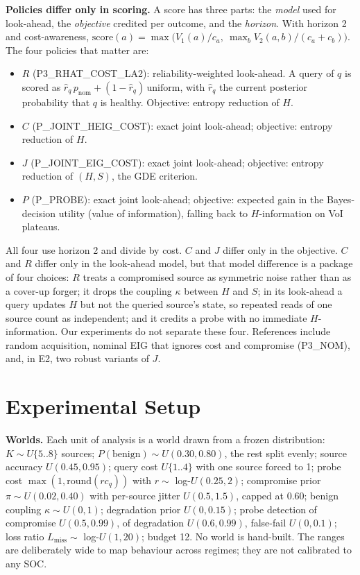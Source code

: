 \documentclass[conference]{IEEEtran}
\newcommand{\pol}[1]{\textsf{#1}}
\begin{document}
\textbf{Policies differ only in scoring.} A score has three parts: the \emph{model} used for look-ahead, the
\emph{objective} credited per outcome, and the \emph{horizon}. With horizon 2 and cost-awareness,
$\text{score}(a)=\max\big(V_1(a)/c_a,\ \max_b V_2(a,b)/(c_a+c_b)\big)$. The four policies that matter are:
\begin{itemize}
\item $R$ (\pol{P3\_RHAT\_COST\_LA2}): reliability-weighted look-ahead. A query of $q$ is scored as
$\hat r_q\,p_{\text{nom}}+(1-\hat r_q)\,\text{uniform}$, with $\hat r_q$ the current posterior probability that $q$ is
healthy. Objective: entropy reduction of $H$.
\item $C$ (\pol{P\_JOINT\_HEIG\_COST}): exact joint look-ahead; objective: entropy reduction of $H$.
\item $J$ (\pol{P\_JOINT\_EIG\_COST}): exact joint look-ahead; objective: entropy reduction of $(H,S)$, the GDE criterion.
\item $P$ (\pol{P\_PROBE}): exact joint look-ahead; objective: expected gain in the Bayes-decision utility (value of
information), falling back to $H$-information on VoI plateaus.
\end{itemize}
All four use horizon 2 and divide by cost. $C$ and $J$ differ only in the objective. $C$ and $R$ differ only in the
look-ahead model, but that model difference is a package of four choices: $R$ treats a compromised source as symmetric
noise rather than as a cover-up forger; it drops the coupling $\kappa$ between $H$ and $S$; in its look-ahead a query
updates $H$ but not the queried source's state, so repeated reads of one source count as independent; and it credits a
probe with no immediate $H$-information. Our experiments do not separate these four. References include random
acquisition, nominal EIG that ignores cost and compromise (\pol{P3\_NOM}), and, in E2, two robust variants of $J$.

\section{Experimental Setup}\label{sec:setup}

\textbf{Worlds.} Each unit of analysis is a world drawn from a frozen distribution: $K\sim U\{5..8\}$ sources;
$P(\text{benign})\sim U(0.30,0.80)$, the rest split evenly; source accuracy $U(0.45,0.95)$; query cost $U\{1..4\}$ with
one source forced to 1; probe cost $\max(1,\mathrm{round}(r c_q))$ with $r\sim$ log-$U(0.25,2)$; compromise prior
$\pi\sim U(0.02,0.40)$ with per-source jitter $U(0.5,1.5)$, capped at 0.60; benign coupling $\kappa\sim U(0,1)$;
degradation prior $U(0,0.15)$; probe detection of compromise $U(0.5,0.99)$, of degradation $U(0.6,0.99)$, false-fail
$U(0,0.1)$; loss ratio $L_{\text{miss}}\sim$ log-$U(1,20)$; budget 12. No world is hand-built. The ranges are
deliberately wide to map behaviour across regimes; they are not calibrated to any SOC.
\end{document}
